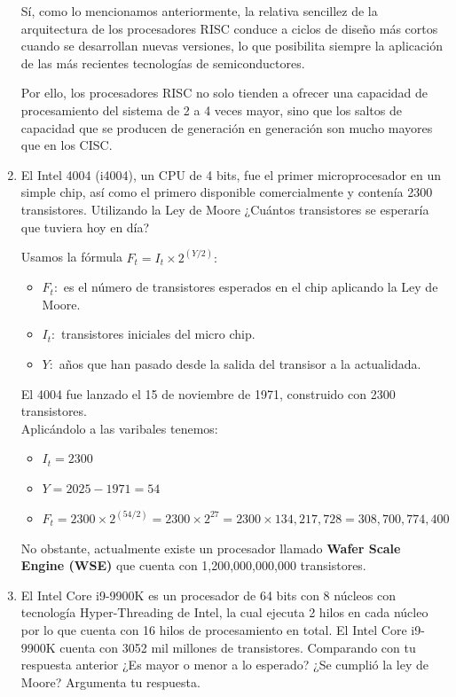 \documentclass[12pt,letterpaper]{article}
\begin{document}
\begin{enumerate}
  Sí, como lo mencionamos anteriormente, la relativa sencillez de la arquitectura de los procesadores RISC conduce a ciclos de diseño más cortos cuando se desarrollan nuevas versiones, lo que posibilita siempre la aplicación de las más recientes tecnologías de semiconductores.

  Por ello, los procesadores RISC no solo tienden a ofrecer una capacidad de procesamiento del sistema de 2 a 4 veces mayor, sino que los saltos de capacidad que se producen de generación en generación son mucho mayores que en los CISC.
  \bigskip
  
\item El Intel 4004 (i4004), un CPU de 4 bits, fue el primer microprocesador en un simple chip, así como el primero disponible comercialmente y contenía 2300 transistores. Utilizando la Ley de Moore ¿Cuántos transistores se esperaría que tuviera hoy en día?
  \bigskip

  Usamos la f\'{o}rmula $F_t= I_t \times 2^{(Y/2)}:$
  \begin{itemize}
  \item $F_t:$ es el número de transistores esperados en el chip aplicando la Ley de Moore.
  \item $I_t:$ transistores iniciales del micro chip.
  \item $Y:$ años que han pasado desde la salida del transisor a la actualidada.
  \end{itemize}
  
  El 4004 fue lanzado el 15 de noviembre de 1971, construido con 2300 transistores.\\
  Aplic\'{a}ndolo a las varibales tenemos:

  \begin{itemize}
  
  \item $I_t = 2300$
  \item $Y = 2025- 1971 = 54$
  \item $F_t= 2300 \times 2^{(54/2)} = 2300 \times 2^{27} = 2300 \times 134,217,728 = 308,700,774,400$
  \end{itemize}

  No obstante, actualmente existe un procesador llamado \textbf{Wafer Scale Engine (WSE)} que cuenta con 1,200,000,000,000 transistores.
  \bigskip
  
\item El Intel Core i9-9900K es un procesador de 64 bits con 8 núcleos con tecnología Hyper-Threading de Intel, la cual ejecuta 2 hilos en cada núcleo por lo que cuenta con 16 hilos de procesamiento en total. El Intel Core i9-9900K cuenta con 3052 mil millones de transistores. Comparando con tu respuesta anterior ¿Es mayor o menor a lo esperado? ¿Se cumplió la ley de Moore? Argumenta tu respuesta.


\end{enumerate}
\end{document}
